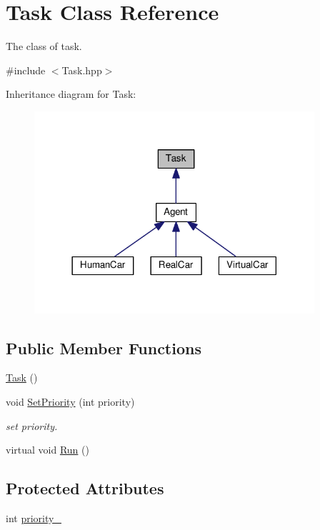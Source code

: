 \hypertarget{classTask}{}\section{Task Class Reference}
\label{classTask}


The class of task.  




{\ttfamily \#include $<$Task.\+hpp$>$}



Inheritance diagram for Task\+:\nopagebreak
\begin{figure}[H]
\begin{center}
\leavevmode
\includegraphics[width=294pt]{classTask__inherit__graph}
\end{center}
\end{figure}
\subsection*{Public Member Functions}
\begin{DoxyCompactItemize}
\item 
\hyperlink{classTask_a0ca53354bdc006762a0fda68c64f7608}{Task} ()
\item 
void \hyperlink{classTask_abf2fe0d1d748f8efee8fdf86f588ebcb}{Set\+Priority} (int priority)
\begin{DoxyCompactList}\small\item\em set priority. \end{DoxyCompactList}\item 
virtual void \hyperlink{classTask_a18ea998d77c751e6e1581f7035022a5b}{Run} ()
\end{DoxyCompactItemize}
\subsection*{Protected Attributes}
\begin{DoxyCompactItemize}
\item 
int \hyperlink{classTask_ad7d1b58e73a2d716dabd08ab985a35f9}{priority\+\_\+}
\end{DoxyCompactItemize}


